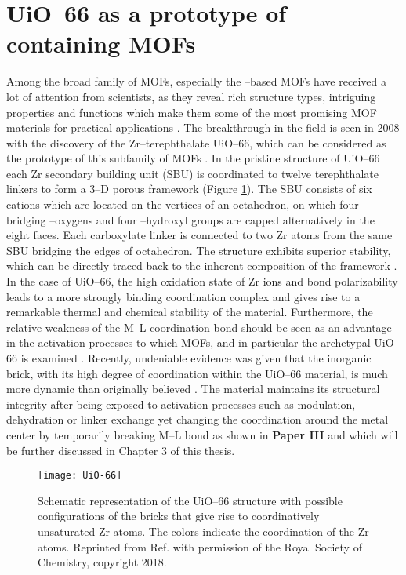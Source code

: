 \section{UiO--66 as a prototype of --containing MOFs}
\label{sec:UiO-66}
Among the broad family of MOFs, especially the --based MOFs have
received a lot of attention from scientists, as they reveal rich structure
types, intriguing properties and functions which make them some of the most
promising MOF materials for practical applications \cite{Bai2016}. The
breakthrough in the field is seen in 2008 with the discovery of the Zr--terephthalate UiO--66, which can be
considered as the prototype of this subfamily of MOFs \cite{Cavka2008}. In the
pristine structure of UiO--66 each Zr secondary building unit (SBU)
 is coordinated to twelve terephthalate linkers to form a 3--D porous framework (Figure \ref{fig:UiO-66}). The SBU consists
of six  cations which are located on the vertices of an octahedron, on
which four bridging --oxygens and four --hydroxyl
groups are capped alternatively in the eight faces. Each carboxylate linker is
connected to two Zr atoms from the same SBU bridging the edges of  octahedron. The
structure exhibits superior stability, which can be directly traced back to the
inherent composition of the framework \cite{Valenzano2011, Wu2013}. In the case
of UiO--66, the high oxidation state of Zr ions and bond polarizability leads to
a more strongly binding coordination complex and gives rise to a remarkable
thermal and chemical stability of the material. Furthermore, the relative
weakness of the M--L coordination bond should be seen as an advantage in the
activation processes to which MOFs, and in particular the archetypal UiO--66 is
examined \cite{Burtch2014, Morris2017}. Recently, undeniable evidence was given
that the inorganic brick, with its high degree of coordination within the
UiO--66 material, is much more dynamic than originally believed
\cite{Nishida2014, Cohen2017, Kim2012, Kim2012a}. The material maintains its structural integrity after being exposed to activation processes such as modulation, dehydration or linker exchange yet changing the coordination around the metal center by temporarily breaking M--L bond as shown in \textbf{Paper III} and which will be further discussed in Chapter 3 of this thesis.

\begin{figure}[!h]
	\centering
	\texttt{[image: UiO-66]}
	\caption[Schematic representation of the UiO--66 structure with possible
	configurations of the bricks that give rise to coordinatively unsaturated Zr
	atoms. The colors indicate the coordination of the Zr atoms.]{Schematic
	representation of the UiO--66 structure with possible configurations of the bricks that give rise to coordinatively unsaturated Zr
	atoms. The colors indicate the coordination of the Zr atoms. Reprinted from
	Ref. \cite{Hajek2018} with permission of the Royal Society of Chemistry,
	copyright 2018.}
	\label{fig:UiO-66}
\end{figure}


